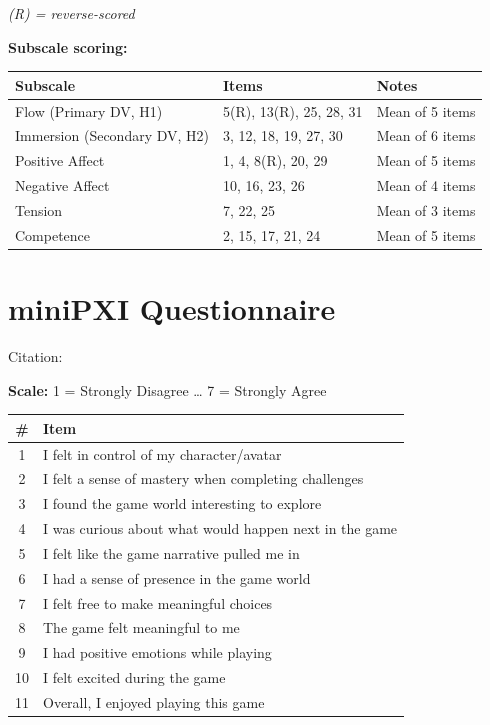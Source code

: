 \textit{(R) = reverse-scored}

\vspace{0.5cm}
\textbf{Subscale scoring:}

\begin{table}[H]
\centering
\small
\begin{tabular}{@{}lll@{}}
\toprule
\textbf{Subscale} & \textbf{Items} & \textbf{Notes} \\
\midrule
Flow (Primary DV, H1) & 5(R), 13(R), 25, 28, 31 & Mean of 5 items \\
Immersion (Secondary DV, H2) & 3, 12, 18, 19, 27, 30 & Mean of 6 items \\
Positive Affect & 1, 4, 8(R), 20, 29 & Mean of 5 items \\
Negative Affect & 10, 16, 23, 26 & Mean of 4 items \\
Tension & 7, 22, 25 & Mean of 3 items \\
Competence & 2, 15, 17, 21, 24 & Mean of 5 items \\
\bottomrule
\end{tabular}
\end{table}


\chapter{miniPXI Questionnaire}
\label{app:minipxi}

Citation: \citet{vornhagen2022minipxi}

\textbf{Scale:} 1 = Strongly Disagree \ldots{} 7 = Strongly Agree

\begin{longtable}{@{}cl@{}}
\toprule
\textbf{\#} & \textbf{Item} \\
\midrule
\endfirsthead
1 & I felt in control of my character/avatar \\
2 & I felt a sense of mastery when completing challenges \\
3 & I found the game world interesting to explore \\
4 & I was curious about what would happen next in the game \\
5 & I felt like the game narrative pulled me in \\
6 & I had a sense of presence in the game world \\
7 & I felt free to make meaningful choices \\
8 & The game felt meaningful to me \\
9 & I had positive emotions while playing \\
10 & I felt excited during the game \\
11 & Overall, I enjoyed playing this game \\
\bottomrule
\end{longtable}


